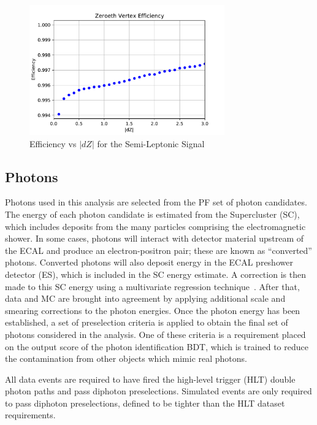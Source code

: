 \begin{figure}[H]
    \centering
    \includegraphics[width=0.75\textwidth]{Sections/HHWWgg/images/Objects/VtxEff.pdf}
    \caption{Efficiency vs $|dZ|$ for the Semi-Leptonic Signal}
\label{fig:VtxEff}
\end{figure}

\subsection{Photons} \label{sec:photons}

Photons used in this analysis are selected from the PF set of photon candidates.
The energy of each photon candidate is estimated from the Supercluster (SC), which
includes deposits from the many particles comprising the electromagnetic shower. In
some cases, photons will interact with detector material upstream of the ECAL and
produce an electron-positron pair; these are known as ``converted'' photons. Converted
photons will also deposit energy in the ECAL preshower detector (ES), which is included
in the SC energy estimate. A correction is then made to this SC energy using a
multivariate regression technique~\cite{Sirunyan:2018ouh}. After that, data and MC are brought into agreement
by applying additional scale and smearing corrections to the photon energies. Once the
photon energy has been established, a set of preselection criteria is applied to obtain the
final set of photons considered in the analysis. One of these criteria is a requirement
placed on the output score of the photon identification BDT, which is trained to
reduce the contamination from other objects which mimic real photons. 

All data events are required to have fired the high-level trigger (HLT) double photon paths and pass diphoton preselections. Simulated events are only required to pass diphoton preselections, defined to be tighter than the HLT dataset requirements. 

